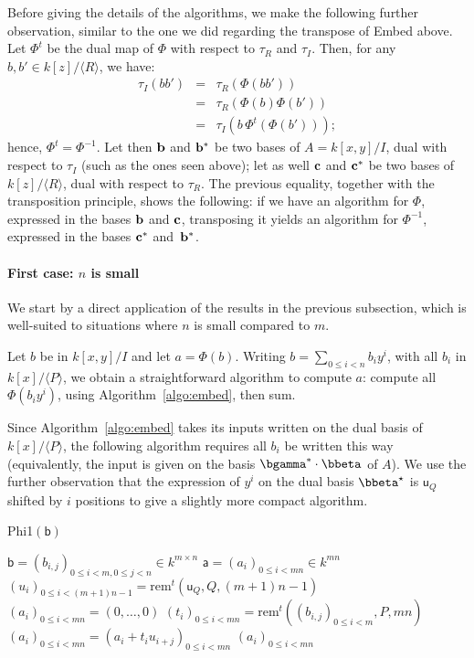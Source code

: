 \documentclass{sig-alternate}
\def\va {\ensuremath{\mathsf{a}}}
\def\vu {\ensuremath{\mathsf{u}}}
\def\vb {\ensuremath{\mathsf{b}}}
\def\rem {\ensuremath{\mathrm{rem}}}
\newcommand{\ang}[1]{\langle#1\rangle}
\begin{document}
Before giving the details of the algorithms, we make the following
further observation, similar to the one we did regarding the transpose
of Embed above. Let $\Phi^t$ be the dual map of $\Phi$ with respect to
$\tau_R$ and $\tau_I$. Then, for any $b,b' \in k[z]/\ang{R}$, we have:
\begin{eqnarray*}
\tau_I(b b') &=&  \tau_R(\Phi(b b'))\\
&=& \tau_R( \Phi(b) \Phi(b')) \\
&=& \tau_I(b\, \Phi^t(\Phi(b')));
\end{eqnarray*}
hence, $\Phi^t = \Phi^{-1}$. Let then ${\bf b}$ and ${\bf b}^\ast$ be
two bases of $A=k[x,y]/I$, dual with respect to $\tau_I$ (such as the
ones seen above); let as well ${\bf c}$ and ${\bf c}^\ast$ be two
bases of $k[z]/\ang{R}$, dual with respect to $\tau_R$. The previous
equality, together with the transposition principle, shows the
following: if we have an algorithm for $\Phi$, expressed in the bases
${\bf b}$ and ${\bf c}$, transposing it yields an algorithm for
$\Phi^{-1}$, expressed in the bases ${\bf c}^\ast$ and~${\bf b}^\ast$.

\paragraph*{{\bf \rm First case: $n$ is small}}
We start by a direct application of the results in the previous
subsection, which is well-suited to situations where $n$ is small
compared to $m$.

Let $b$ be in $k[x,y]/I$ and let $a=\Phi(b)$. Writing $b=\sum_{0 \le i
  < n} b_i y^i$, with all $b_i$ in $k[x]/\ang{P}$, we obtain a
straightforward algorithm to compute $a$: compute all $\Phi(b_iy^i)$,
using Algorithm~\ref{algo:embed}, then sum.

Since Algorithm~\ref{algo:embed} takes its inputs written on the dual
basis of $k[x]/\ang{P}$, the following algorithm requires all $b_i$ be
written this way (equivalently, the input is given on the basis
$\bgamma^\ast \cdot \bbeta$ of $A$). We use the further observation
that the expression of $y^i$ on the dual basis $\bbeta^\star$ is
$\vu_Q$ shifted by $i$ positions to give a slightly more compact
algorithm.

\begin{algorithm}[H]
  \caption{Phi1$(\vb)$}
  \begin{algorithmic}[1]
    \REQUIRE $\vb = (b_{i,j})_{0 \le i < m, 0 \le j < n} \in k^{m \times n}$
    \ENSURE $\va = (a_{i})_{0 \le i < mn} \in k^{m n}$
    \STATE $(u_i)_{0\le i < (m+1)n-1} = \rem^t(\vu_Q,Q,(m+1)n-1)$
    \STATE $(a_i)_{0\le i < mn} = (0,\dots,0)$
    \STATE $(t_i)_{0\le i < mn} = \rem^t( (b_{i,j})_{0 \le i <m}  ,P,mn)$
    \STATE $(a_i)_{0\le i < mn} = (a_i + t_iu_{i+j})_{0\le i < mn}$
    \ENDFOR
    \RETURN $(a_i)_{0\le i <mn}$
  \end{algorithmic}
  \label{algo:iso1}
\end{algorithm}
\end{document}
